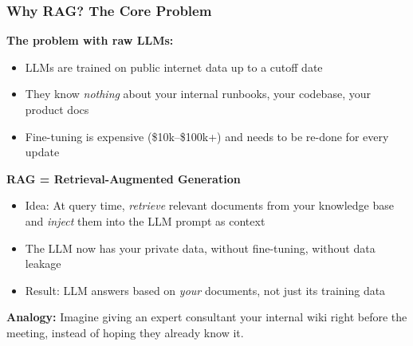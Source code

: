 \begin{frame}[fragile]\frametitle{Why RAG? The Core Problem}
\textbf{The problem with raw LLMs:}
\begin{itemize}
\item LLMs are trained on public internet data up to a cutoff date
\item They know \textit{nothing} about your internal runbooks, your codebase, your product docs
\item Fine-tuning is expensive (\$10k--\$100k+) and needs to be re-done for every update
\end{itemize}

\textbf{RAG = Retrieval-Augmented Generation}
\begin{itemize}
\item Idea: At query time, \textit{retrieve} relevant documents from your knowledge base and \textit{inject} them into the LLM prompt as context
\item The LLM now has your private data, without fine-tuning, without data leakage
\item Result: LLM answers based on \textit{your} documents, not just its training data
\end{itemize}

\textbf{Analogy:} Imagine giving an expert consultant your internal wiki right before the meeting, instead of hoping they already know it.
\end{frame}

